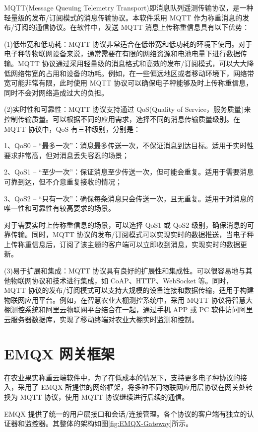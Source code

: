 MQTT(Message Queuing Telemetry Transport)即消息队列遥测传输协议，是一种轻量级的发布/订阅模式的消息传输协议。本软件采用 MQTT 作为称重消息的发布/订阅的通信协议。在软件中，发送 MQTT 消息上传称重信息具有以下优势：

(1)低带宽和低功耗：MQTT 协议非常适合在低带宽和低功耗的环境下使用。对于电子秤等物联网设备来说，通常需要在有限的网络资源和电池电量下进行数据传输。MQTT 协议通过采用轻量级的消息格式和高效的发布/订阅模式，可以大大降低网络带宽的占用和设备的功耗。例如，在一些偏远地区或者移动环境下，网络带宽可能非常有限，此时使用 MQTT 协议可以确保电子秤能够及时上传称重信息，同时不会对网络造成过大的负担\cite{Jia2015}。

(2)实时性和可靠性：MQTT 协议支持通过 QoS(Quality of Service，服务质量)来控制传输质量。可以根据不同的应用需求，选择不同的消息传输质量级别。在 MQTT 协议中，QoS 有三种级别\cite{Jia2015}，分别是：

1、QoS0 – “最多一次”：消息最多传送一次，不保证消息到达目标。适用于实时性要求非常高，但对消息丢失容忍的场景；

2、QoS1 – “至少一次”：保证消息至少传送一次，但可能会重复。适用于需要消息可靠到达，但不介意重复接收的情况；

3、QoS2 – “只有一次”：确保每条消息只会传送一次，且无重复。适用于对消息的唯一性和可靠性有较高要求的场景。

对于需要实时上传称重信息的场景，可以选择 QoS1 或 QoS2 级别，确保消息的可靠传输。同时，MQTT 协议的发布/订阅模式可以实现实时的数据推送，当电子秤上传称重信息后，订阅了该主题的客户端可以立即收到消息，实现实时的数据更新。

(3)易于扩展和集成：MQTT 协议具有良好的扩展性和集成性。可以很容易地与其他物联网协议和技术进行集成，如 CoAP、HTTP、WebSocket 等。同时，MQTT 协议的发布/订阅模式可以支持大规模的设备连接和数据传输，适用于构建物联网应用平台。例如，在智慧农业大棚测控系统中，采用 MQTT 协议将智慧大棚测控系统和阿里云物联网平台结合在一起，通过手机 APP 或 PC 软件访问阿里云服务器数据库，实现了移动终端对农业大棚实时监测和控制\cite{Liang2020}。

\section{EMQX 网关框架}\label{sec:emqx}

在农业果实称重云端软件中，为了在低成本的情况下，支持更多电子秤协议的接入，采用了 EMQX 所提供的网络框架，将多种不同物联网应用层协议在网关处转换为 MQTT 协议，使用 MQTT 协议继续进行后续的通信。

EMQX 提供了统一的用户层接口和会话/连接管理。各个协议的客户端有独立的认证器和监控器\cite{EMQX-Gateway}。其整体的架构如图\ref{fig:EMQX-Gateway}所示。


